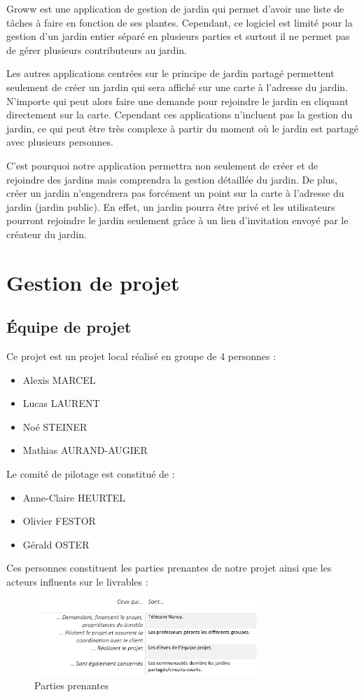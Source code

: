 \documentclass[french,a4paper]{article}
\begin{document}
Groww est une application de gestion de jardin qui permet d’avoir une liste de tâches à faire en fonction de ses plantes. Cependant, ce logiciel est limité pour la gestion d’un jardin entier séparé en plusieurs parties et surtout il ne permet pas de gérer plusieurs contributeurs au jardin.

Les autres applications centrées sur le principe de jardin partagé permettent seulement de créer un jardin qui sera affiché sur une carte à l’adresse du jardin. N’importe qui peut alors faire une demande pour rejoindre le jardin en cliquant directement sur la carte. Cependant ces applications n’incluent pas la gestion du jardin, ce qui peut être très complexe à partir du moment où le jardin est partagé avec plusieurs personnes.

C’est pourquoi notre application permettra non seulement de créer et de rejoindre des jardins mais comprendra la gestion détaillée du jardin. De plus, créer un jardin n’engendrera pas forcément un point sur la carte à l’adresse du jardin (jardin public). En effet, un jardin pourra être privé et les utilisateurs pourront rejoindre le jardin seulement grâce à un lien d’invitation envoyé par le créateur du jardin.


\newpage
\section{Gestion de projet}
\subsection{Équipe de projet}
Ce projet est un projet local réalisé en groupe de 4 personnes :
\begin{itemize}
    \item Alexis MARCEL
    \item Lucas LAURENT
    \item Noé STEINER
    \item Mathias AURAND-AUGIER
\end{itemize}
Le comité de pilotage est constitué de :
\begin{itemize}
    \item Anne-Claire HEURTEL
    \item Olivier FESTOR
    \item Gérald OSTER
\end{itemize}
Ces personnes constituent les parties prenantes de notre projet ainsi que les acteurs influents sur le livrables :
\begin{figure}[H]
    \centering
    \includegraphics[width=0.75\textwidth]{img/parties_prenantes.png}
    \caption{Parties prenantes}
\end{figure} 
\end{document}
